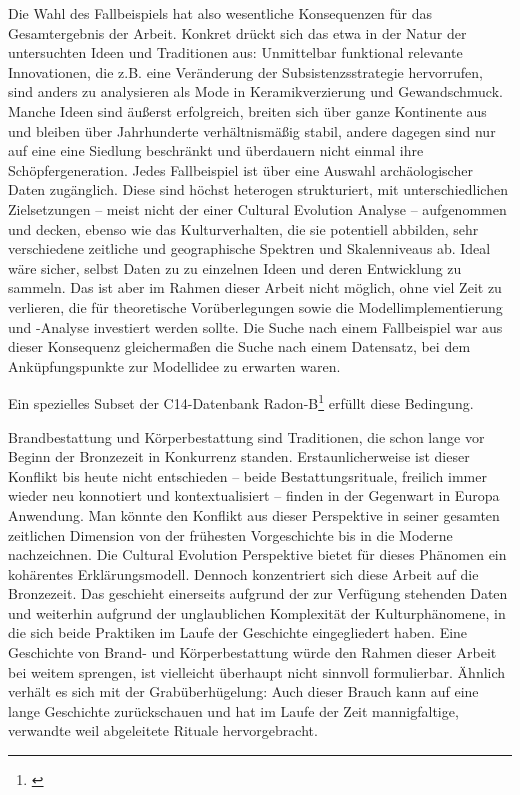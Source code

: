 \documentclass[openany,twoside,twocolumn]{book}
\let\rmarkdownfootnote\footnote%
\def\footnote{\protect\rmarkdownfootnote}
\begin{document}
Die Wahl des Fallbeispiels hat also wesentliche Konsequenzen für das
Gesamtergebnis der Arbeit. Konkret drückt sich das etwa in der Natur der
untersuchten Ideen und Traditionen aus: Unmittelbar funktional relevante
Innovationen, die z.B. eine Veränderung der Subsistenzsstrategie
hervorrufen, sind anders zu analysieren als Mode in Keramikverzierung
und Gewandschmuck. Manche Ideen sind äußerst erfolgreich, breiten sich
über ganze Kontinente aus und bleiben über Jahrhunderte verhältnismäßig
stabil, andere dagegen sind nur auf eine eine Siedlung beschränkt und
überdauern nicht einmal ihre Schöpfergeneration. Jedes Fallbeispiel ist
über eine Auswahl archäologischer Daten zugänglich. Diese sind höchst
heterogen strukturiert, mit unterschiedlichen Zielsetzungen -- meist
nicht der einer Cultural Evolution Analyse -- aufgenommen und decken,
ebenso wie das Kulturverhalten, die sie potentiell abbilden, sehr
verschiedene zeitliche und geographische Spektren und Skalenniveaus ab.
Ideal wäre sicher, selbst Daten zu zu einzelnen Ideen und deren
Entwicklung zu sammeln. Das ist aber im Rahmen dieser Arbeit nicht
möglich, ohne viel Zeit zu verlieren, die für theoretische
Vorüberlegungen sowie die Modellimplementierung und -Analyse investiert
werden sollte. Die Suche nach einem Fallbeispiel war aus dieser
Konsequenz gleichermaßen die Suche nach einem Datensatz, bei dem
Anküpfungspunkte zur Modellidee zu erwarten waren.

Ein spezielles Subset der C14-Datenbank Radon-B\footnote{\textcite{jutta_kneisel_radon-b_2013}}
erfüllt diese Bedingung.

Brandbestattung und Körperbestattung sind Traditionen, die schon lange
vor Beginn der Bronzezeit in Konkurrenz standen. Erstaunlicherweise ist
dieser Konflikt bis heute nicht entschieden -- beide Bestattungsrituale,
freilich immer wieder neu konnotiert und kontextualisiert -- finden in
der Gegenwart in Europa Anwendung. Man könnte den Konflikt aus dieser
Perspektive in seiner gesamten zeitlichen Dimension von der frühesten
Vorgeschichte bis in die Moderne nachzeichnen. Die Cultural Evolution
Perspektive bietet für dieses Phänomen ein kohärentes Erklärungsmodell.
Dennoch konzentriert sich diese Arbeit auf die Bronzezeit. Das geschieht
einerseits aufgrund der zur Verfügung stehenden Daten und weiterhin
aufgrund der unglaublichen Komplexität der Kulturphänomene, in die sich
beide Praktiken im Laufe der Geschichte eingegliedert haben. Eine
Geschichte von Brand- und Körperbestattung würde den Rahmen dieser
Arbeit bei weitem sprengen, ist vielleicht überhaupt nicht sinnvoll
formulierbar. Ähnlich verhält es sich mit der Grabüberhügelung: Auch
dieser Brauch kann auf eine lange Geschichte zurückschauen und hat im
Laufe der Zeit mannigfaltige, verwandte weil abgeleitete Rituale
hervorgebracht.
\end{document}
